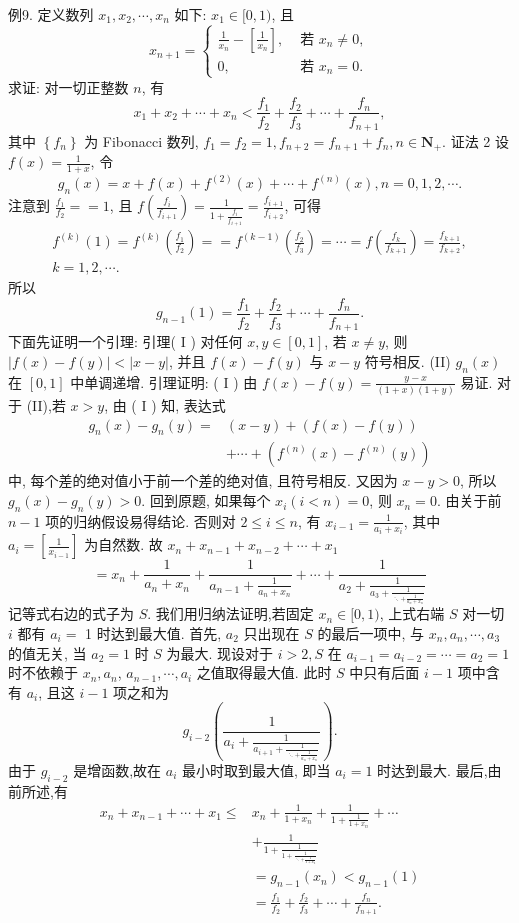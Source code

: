 例9. 定义数列 $x_1, x_2, \cdots, x_n$ 如下: $x_1 \in[0,1)$, 且
$$
x_{n+1}= \begin{cases}\frac{1}{x_n}-\left[\frac{1}{x_n}\right], & \text { 若 } x_n \neq 0, \\ 0, & \text { 若 } x_n=0 .\end{cases}
$$
求证: 对一切正整数 $n$, 有
$$
x_1+x_2+\cdots+x_n<\frac{f_1}{f_2}+\frac{f_2}{f_3}+\cdots+\frac{f_n}{f_{n+1}},
$$
其中 $\left\{f_n\right\}$ 为 Fibonacci 数列, $f_1=f_2=1, f_{n+2}=f_{n+1}+f_n, n \in \mathbf{N}_{+}$.
证法 2 设 $f(x)=\frac{1}{1+x}$, 令
$$
g_n(x)=x+f(x)+f^{(2)}(x)+\cdots+f^{(n)}(x), n=0,1,2, \cdots .
$$
注意到 $\frac{f_1}{f_2}==1$, 且 $f\left(\frac{f_i}{f_{i+1}}\right)=\frac{1}{1+\frac{f_i}{f_{i+1}}}=\frac{f_{i+1}}{f_{i+2}}$, 可得
$$
\begin{gathered}
f^{(k)}(1)=f^{(k)}\left(\frac{f_1}{f_2}\right)==f^{(k-1)}\left(\frac{f_2}{f_3}\right)=\cdots=f\left(\frac{f_k}{f_{k+1}}\right)=\frac{f_{k+1}}{f_{k+2}}, \\
k=1,2, \cdots .
\end{gathered}
$$
所以
$$
g_{n-1}(1)=\frac{f_1}{f_2}+\frac{f_2}{f_3}+\cdots+\frac{f_n}{f_{n+1}} .
$$
下面先证明一个引理:
引理( I ) 对任何 $x, y \in[0,1]$, 若 $x \neq y$, 则 $|f(x)-f(y)|<|x-y|$, 并且 $f(x)-f(y)$ 与 $x-y$ 符号相反.
(II) $g_n(x)$ 在 $[0,1]$ 中单调递增.
引理证明: ( I ) 由 $f(x)-f(y)=\frac{y-x}{(1+x)(1+y)}$ 易证.
对于 (II),若 $x>y$, 由 ( I ) 知, 表达式
$$
\begin{aligned}
g_n(x)-g_n(y)= & (x-y)+(f(x)-f(y)) \\
& +\cdots+\left(f^{(n)}(x)-f^{(n)}(y)\right)
\end{aligned}
$$
中, 每个差的绝对值小于前一个差的绝对值, 且符号相反.
又因为 $x-y>0$, 所以 $g_n(x)-g_n(y)>0$.
回到原题, 如果每个 $x_i(i<n)=0$, 则 $x_n=0$. 由关于前 $n-1$ 项的归纳假设易得结论.
否则对 $2 \leqslant i \leqslant n$, 有 $x_{i-1}=\frac{1}{a_i+x_i}$, 其中 $a_i=\left[\frac{1}{x_{i-1}}\right]$ 为自然数.
故 $x_n+x_{n-1}+x_{n-2}+\cdots+x_1$
$$
=x_n+\frac{1}{a_n+x_n}+\frac{1}{a_{n-1}+\frac{1}{a_n+x_n}}+\cdots+\frac{1}{a_2+\frac{1}{a_3+\frac{1}{\ddots+\frac{1}{a_n+x_n}}}}
$$
记等式右边的式子为 $S$.
我们用归纳法证明,若固定 $x_n \in[0,1)$, 上式右端 $S$ 对一切 $i$ 都有 $a_i=$ 1 时达到最大值.
首先, $a_2$ 只出现在 $S$ 的最后一项中, 与 $x_n, a_n, \cdots, a_3$ 的值无关, 当 $a_2=1$ 时 $S$ 为最大.
现设对于 $i>2, S$ 在 $a_{i-1}=a_{i-2}=\cdots=a_2=1$ 时不依赖于 $x_n, a_n$, $a_{n-1}, \cdots, a_i$ 之值取得最大值.
此时 $S$ 中只有后面 $i-1$ 项中含有 $a_i$, 且这 $i-1$ 项之和为
$$
g_{i-2}\left(\frac{1}{a_i+\frac{1}{a_{i+1}+\frac{1}{\ddots+\frac{1}{a_n+x_n}}}}\right) .
$$
由于 $g_{i-2}$ 是增函数,故在 $a_i$ 最小时取到最大值, 即当 $a_i=1$ 时达到最大.
最后,由前所述,有
$$
\begin{aligned}
x_n+x_{n-1}+\cdots+x_1 \leqslant & x_n+\frac{1}{1+x_n}+\frac{1}{1+\frac{1}{1+x_n}}+\cdots \\
& +\frac{1}{1+\frac{1}{1+\frac{1}{\ddots+\frac{1}{1+x_n}}}} \\
& =g_{n-1}\left(x_n\right)<g_{n-1}(1) \\
& =\frac{f_1}{f_2}+\frac{f_2}{f_3}+\cdots+\frac{f_n}{f_{n+1}} .
\end{aligned}
$$



